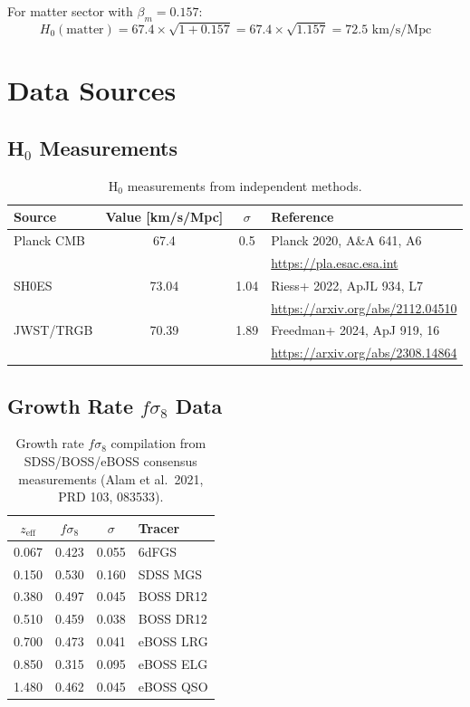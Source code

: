 \documentclass[11pt]{article}
\begin{document}
For matter sector with $\beta_m = 0.157$:
\begin{equation}
H_0(\text{matter}) = 67.4 \times \sqrt{1 + 0.157} = 67.4 \times \sqrt{1.157} = 72.5 \text{ km/s/Mpc}
\end{equation}

\section{Data Sources}

\subsection{H$_0$ Measurements}

\begin{table}[h]
\centering
\begin{tabular}{lccp{5cm}}
\toprule
Source & Value [km/s/Mpc] & $\sigma$ & Reference \\
\midrule
Planck CMB & 67.4 & 0.5 & Planck 2020, A\&A 641, A6 \\
 & & & \url{https://pla.esac.esa.int} \\
\midrule
SH0ES & 73.04 & 1.04 & Riess+ 2022, ApJL 934, L7 \\
 & & & \url{https://arxiv.org/abs/2112.04510} \\
\midrule
JWST/TRGB & 70.39 & 1.89 & Freedman+ 2024, ApJ 919, 16 \\
 & & & \url{https://arxiv.org/abs/2308.14864} \\
\bottomrule
\end{tabular}
\caption{H$_0$ measurements from independent methods.}
\end{table}

\subsection{Growth Rate $f\sigma_8$ Data}

\begin{table}[h]
\centering
\begin{tabular}{cccp{4cm}}
\toprule
$z_{\text{eff}}$ & $f\sigma_8$ & $\sigma$ & Tracer \\
\midrule
0.067 & 0.423 & 0.055 & 6dFGS \\
0.150 & 0.530 & 0.160 & SDSS MGS \\
0.380 & 0.497 & 0.045 & BOSS DR12 \\
0.510 & 0.459 & 0.038 & BOSS DR12 \\
0.700 & 0.473 & 0.041 & eBOSS LRG \\
0.850 & 0.315 & 0.095 & eBOSS ELG \\
1.480 & 0.462 & 0.045 & eBOSS QSO \\
\bottomrule
\end{tabular}
\caption{Growth rate $f\sigma_8$ compilation from SDSS/BOSS/eBOSS consensus measurements (Alam et al.\ 2021, PRD 103, 083533).}
\end{table}
\end{document}
